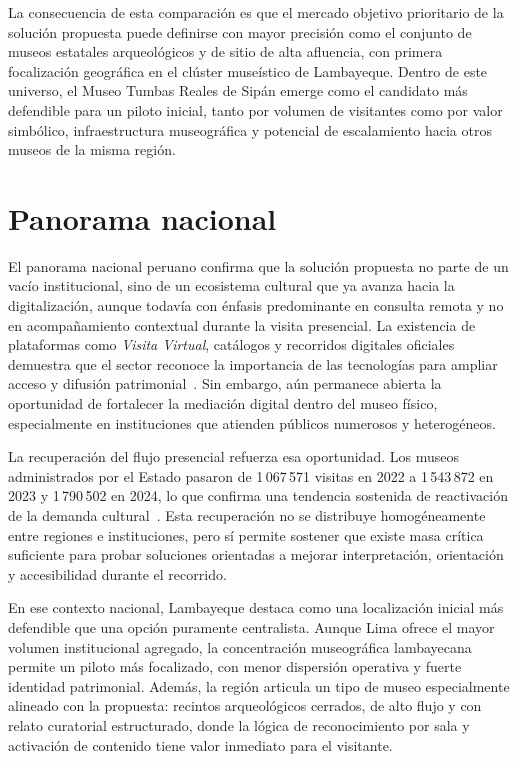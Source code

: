 La consecuencia de esta comparación es que el mercado objetivo prioritario de la solución propuesta puede definirse con mayor precisión como el conjunto de museos estatales arqueológicos y de sitio de alta afluencia, con primera focalización geográfica en el clúster museístico de Lambayeque. Dentro de este universo, el Museo Tumbas Reales de Sipán emerge como el candidato más defendible para un piloto inicial, tanto por volumen de visitantes como por valor simbólico, infraestructura museográfica y potencial de escalamiento hacia otros museos de la misma región.

\section{Panorama nacional}

El panorama nacional peruano confirma que la solución propuesta no parte de un vacío institucional, sino de un ecosistema cultural que ya avanza hacia la digitalización, aunque todavía con énfasis predominante en consulta remota y no en acompañamiento contextual durante la visita presencial. La existencia de plataformas como \textit{Visita Virtual}, catálogos y recorridos digitales oficiales demuestra que el sector reconoce la importancia de las tecnologías para ampliar acceso y difusión patrimonial~\cite{visitavirtual2026}. Sin embargo, aún permanece abierta la oportunidad de fortalecer la mediación digital dentro del museo físico, especialmente en instituciones que atienden públicos numerosos y heterogéneos.

La recuperación del flujo presencial refuerza esa oportunidad. Los museos administrados por el Estado pasaron de 1\,067\,571 visitas en 2022 a 1\,543\,872 en 2023 y 1\,790\,502 en 2024, lo que confirma una tendencia sostenida de reactivación de la demanda cultural~\cite{cultura2022memoria,cultura2023memoria,cultura2024reporte}. Esta recuperación no se distribuye homogéneamente entre regiones e instituciones, pero sí permite sostener que existe masa crítica suficiente para probar soluciones orientadas a mejorar interpretación, orientación y accesibilidad durante el recorrido.

En ese contexto nacional, Lambayeque destaca como una localización inicial más defendible que una opción puramente centralista. Aunque Lima ofrece el mayor volumen institucional agregado, la concentración museográfica lambayecana permite un piloto más focalizado, con menor dispersión operativa y fuerte identidad patrimonial. Además, la región articula un tipo de museo especialmente alineado con la propuesta: recintos arqueológicos cerrados, de alto flujo y con relato curatorial estructurado, donde la lógica de reconocimiento por sala y activación de contenido tiene valor inmediato para el visitante.

